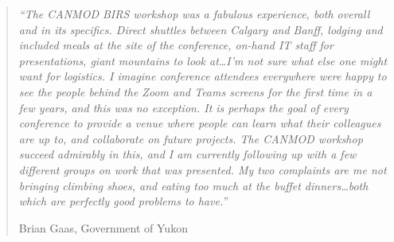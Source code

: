 \begin{quote}
\textit{``The CANMOD BIRS workshop was a fabulous experience, both overall and in its specifics. Direct shuttles between Calgary and Banff, lodging and included meals at the site of the conference, on-hand IT staff for presentations, giant mountains to look at\ldots I'm not sure what else one might want for logistics. I imagine conference attendees everywhere were happy to see the people behind the Zoom and Teams screens for the first time in a few years, and this was no exception. It is perhaps the goal of every conference to provide a venue where people can learn what their colleagues are up to, and collaborate on future projects. The CANMOD workshop succeed admirably in this, and I am currently following up with a few different groups on work that was presented. My two complaints are me not bringing climbing shoes, and eating too much at the buffet dinners\ldots both which are perfectly good problems to have.''}

\hfill Brian Gaas, Government of Yukon
\end{quote}